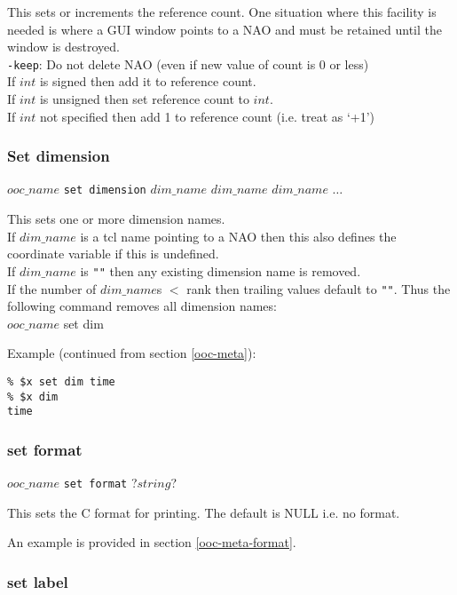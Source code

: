 This sets or increments the reference count. One situation where
  this facility is needed is where a GUI window points to a NAO and
  must be retained until the window is destroyed.
  \\
  \texttt{-keep}: Do not delete NAO (even if new value of count is 0 or less)
  \\
If $int$ is signed then add it to reference count.
  \\
If $int$ is unsigned then set reference count to $int$.
  \\
If $int$ not specified then add 1 to reference count (i.e.  treat as `+1')

\subsubsection{Set dimension}
    \label{ooc-modify-set-dimension}

  $ooc\_name$ 
  \texttt{set dimension} 
  $dim\_name$ 
  $dim\_name$ 
  $dim\_name$ $\ldots$

This sets one or more dimension names.
  \\If 
  $dim\_name$ is a tcl name pointing to a NAO then this also
  defines the coordinate variable if this is undefined.
  \\If 
  $dim\_name$ is 
  \texttt{""} then any existing dimension name is
  removed.
  \\If the number of 
  $dim\_name$s $<$ rank then trailing values default to 
  \texttt{""}. Thus the following command removes all
  dimension names:
\\
$ooc\_name$ set dim

Example (continued from section \ref{ooc-meta}):
  \begin{verbatim}
% $x set dim time
% $x dim
time
\end{verbatim}

\subsubsection{set format}
    \label{ooc-modify-set-format}

$ooc\_name$ \texttt{set format} ?$string$?

This sets the C format for printing. The default is NULL i.e. no
  format.
  

An example is provided in section \ref{ooc-meta-format}.

\subsubsection{set label}
    \label{ooc-modify-set-label}

